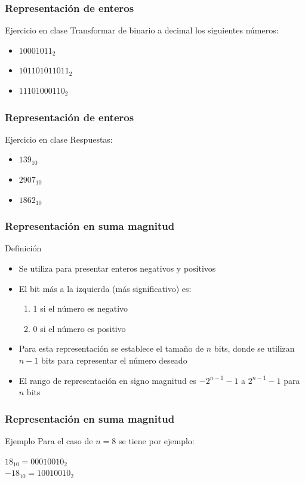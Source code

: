 \documentclass{beamer}
\begin{document}
\begin{frame}
	\frametitle{Representación de enteros}
	\begin{block}{Ejercicio en clase}
	Transformar de binario a decimal los siguientes números:
		\begin{itemize}
			\item $10001011_{2}$
			\item $101101011011_{2}$
			\item $11101000110_{2}$
		\end{itemize}
	\end{block}	
\end{frame}

\begin{frame}
	\frametitle{Representación de enteros}
	\begin{block}{Ejercicio en clase}
	Respuestas:
		\begin{itemize}
			\item $139_{10}$
			\item $2907_{10}$
			\item $1862_{10}$
		\end{itemize}
	\end{block}	
\end{frame}


\begin{frame}
	\frametitle{Representación en suma magnitud}
	\begin{block}{Definición}
		\begin{itemize}
			\item Se utiliza para presentar enteros negativos y positivos
			\item El bit más a la izquierda (más significativo) es:
				\begin{enumerate}
					\item 1 si el número es negativo
					\item 0 si el número es positivo
				\end{enumerate}
			\item Para esta representación se establece el tamaño de $n$ bits, donde se utilizan $n-1$ bits para representar el número deseado
			\item El rango de representación en signo magnitud es $-2^{n-1}-1$ a $2^{n-1}-1$ para $n$ bits
		\end{itemize}
	\end{block}	
\end{frame}


\begin{frame}
	\frametitle{Representación en suma magnitud}

	\begin{exampleblock}{Ejemplo}
	Para el caso de $n=8$ se tiene por ejemplo:
		\begin{center}
			$18_{10} = 00010010_{2}$ \\
			$-18_{10} = 10010010_{2}$
		\end{center}
	\end{exampleblock}
\end{frame}
\end{document}
